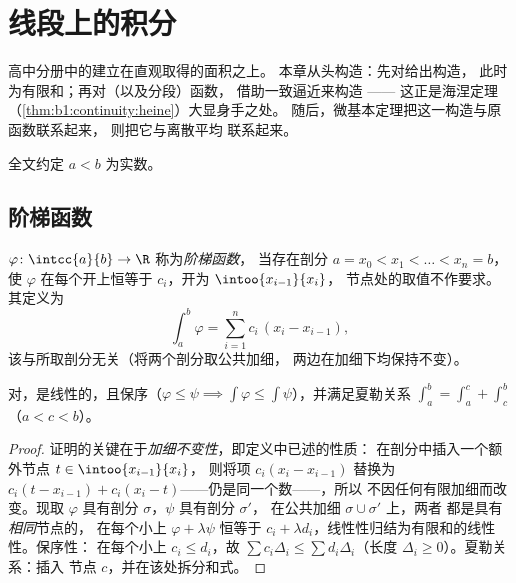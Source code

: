 \chapter{线段上的积分}\label{ch:b1:integration}

高中分册中的建立在直观取得的面积之上。
本章从头构造：先对给出构造，
此时为有限和；再对（以及分段）函数，
借助一致逼近来构造 ——
这正是海涅定理（\cref{thm:b1:continuity:heine}）大显身手之处。
随后，微基本定理把这一构造与原函数联系起来，
则把它与离散平均
联系起来。

全文约定 $a < b$ 为实数。

\section{阶梯函数}

\begin{definition}\label{def:b1:integration:step}
 $\varphi \colon \intcc{a}{b} \to \R$ 称为\emph{阶梯函数}，
当存在剖分 $a = x_0
< x_1 < \dots < x_n = b$，使 $\varphi$ 在每个开上恒等于
$c_i$，开为 $\intoo{x_{i-1}}{x_i}$，
节点处的取值不作要求。其定义为
\[
\int_a^b \varphi = \sum_{i=1}^{n} c_i\,(x_i - x_{i-1}),
\]
该与所取剖分无关（将两个剖分取公共加细，
两边在加细下均保持不变）。
\end{definition}

\begin{proposition}\label{prop:b1:integration:stepprops}
对，是线性的，且保序（$\varphi \leq
\psi \implies \int\varphi \leq \int\psi$），并满足夏勒关系
$\int_a^b = \int_a^c + \int_c^b$（$a < c < b$）。
\end{proposition}

\begin{proof}
证明的关键在于\emph{加细不变性}，即定义中已述的性质：
在剖分中插入一个额外节点 $t \in \intoo{x_{i-1}}{x_i}$，
则将项 $c_i(x_i - x_{i-1})$ 替换为
$c_i(t - x_{i-1}) + c_i(x_i - t)$——仍是同一个数——，所以
不因任何有限加细而改变。现取
$\varphi$ 具有剖分 $\sigma$，$\psi$ 具有剖分 $\sigma'$，
在公共加细 $\sigma \cup \sigma'$ 上，两者
都是具有\emph{相同}节点的，
在每个小上 $\varphi + \lambda\psi$ 恒等于 $c_i + \lambda
d_i$，线性性归结为有限和的线性性。保序性：
在每个小上 $c_i \leq d_i$，故 $\sum c_i \Delta_i \leq \sum
d_i \Delta_i$（长度 $\Delta_i \geq 0$）。夏勒关系：插入
节点 $c$，并在该处拆分和式。
\end{proof}

